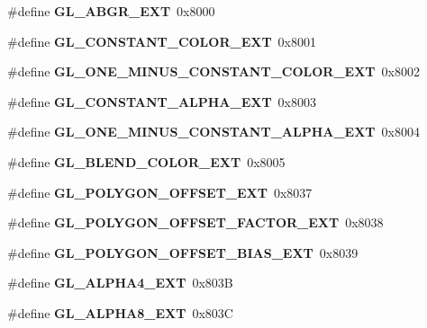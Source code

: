 \begin{DoxyCompactItemize}
\item 
\#define {\bfseries G\+L\+\_\+\+A\+B\+G\+R\+\_\+\+E\+X\+T}~0x8000\label{_s_d_l__opengl_8h_aba576ffdac23399a47e57b1771c8b58f}

\item 
\#define {\bfseries G\+L\+\_\+\+C\+O\+N\+S\+T\+A\+N\+T\+\_\+\+C\+O\+L\+O\+R\+\_\+\+E\+X\+T}~0x8001\label{_s_d_l__opengl_8h_a3163be56d61841a830b74b1cd4cd94c1}

\item 
\#define {\bfseries G\+L\+\_\+\+O\+N\+E\+\_\+\+M\+I\+N\+U\+S\+\_\+\+C\+O\+N\+S\+T\+A\+N\+T\+\_\+\+C\+O\+L\+O\+R\+\_\+\+E\+X\+T}~0x8002\label{_s_d_l__opengl_8h_a371e2f91ba7a606110eeb79897b18a10}

\item 
\#define {\bfseries G\+L\+\_\+\+C\+O\+N\+S\+T\+A\+N\+T\+\_\+\+A\+L\+P\+H\+A\+\_\+\+E\+X\+T}~0x8003\label{_s_d_l__opengl_8h_a547d3c7f8887be69ac599993405eccca}

\item 
\#define {\bfseries G\+L\+\_\+\+O\+N\+E\+\_\+\+M\+I\+N\+U\+S\+\_\+\+C\+O\+N\+S\+T\+A\+N\+T\+\_\+\+A\+L\+P\+H\+A\+\_\+\+E\+X\+T}~0x8004\label{_s_d_l__opengl_8h_afd2f7cbb10dc976a31efb8189d06ffef}

\item 
\#define {\bfseries G\+L\+\_\+\+B\+L\+E\+N\+D\+\_\+\+C\+O\+L\+O\+R\+\_\+\+E\+X\+T}~0x8005\label{_s_d_l__opengl_8h_a60ec3cc2bc6c84b12ef218fa88f746de}

\item 
\#define {\bfseries G\+L\+\_\+\+P\+O\+L\+Y\+G\+O\+N\+\_\+\+O\+F\+F\+S\+E\+T\+\_\+\+E\+X\+T}~0x8037\label{_s_d_l__opengl_8h_a2809440f39362c351e31d5ae9127411d}

\item 
\#define {\bfseries G\+L\+\_\+\+P\+O\+L\+Y\+G\+O\+N\+\_\+\+O\+F\+F\+S\+E\+T\+\_\+\+F\+A\+C\+T\+O\+R\+\_\+\+E\+X\+T}~0x8038\label{_s_d_l__opengl_8h_a5b7607079ca197d24699fc14ee8684e3}

\item 
\#define {\bfseries G\+L\+\_\+\+P\+O\+L\+Y\+G\+O\+N\+\_\+\+O\+F\+F\+S\+E\+T\+\_\+\+B\+I\+A\+S\+\_\+\+E\+X\+T}~0x8039\label{_s_d_l__opengl_8h_ac00eb413b15d6b9e5e3233ba123955cd}

\item 
\#define {\bfseries G\+L\+\_\+\+A\+L\+P\+H\+A4\+\_\+\+E\+X\+T}~0x803\+B\label{_s_d_l__opengl_8h_af3ae04a6be7d354084b82492a894bb44}

\item 
\#define {\bfseries G\+L\+\_\+\+A\+L\+P\+H\+A8\+\_\+\+E\+X\+T}~0x803\+C\label{_s_d_l__opengl_8h_a02d722146b3a3e7a89a0bcb486181910}


\end{DoxyCompactItemize}
